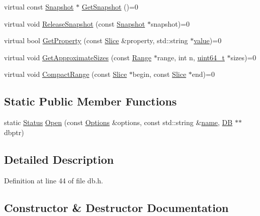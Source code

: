 \begin{DoxyCompactItemize}
\item 
virtual const \hyperlink{classleveldb_1_1_snapshot}{Snapshot} $\ast$ \hyperlink{classleveldb_1_1_d_b_a7d13f6336c7c5f0bf79578d57c45568c}{Get\+Snapshot} ()=0
\item 
virtual void \hyperlink{classleveldb_1_1_d_b_aa46de65e990bd179db0aee770af89144}{Release\+Snapshot} (const \hyperlink{classleveldb_1_1_snapshot}{Snapshot} $\ast$snapshot)=0
\item 
virtual bool \hyperlink{classleveldb_1_1_d_b_afcd557d80bac6668f20372c9e737d807}{Get\+Property} (const \hyperlink{classleveldb_1_1_slice}{Slice} \&property, std\+::string $\ast$\hyperlink{cache_8cc_a0f61d63b009d0880a89c843bd50d8d76}{value})=0
\item 
virtual void \hyperlink{classleveldb_1_1_d_b_ad4d54aa1dbcecc8583b013ab2d67aeff}{Get\+Approximate\+Sizes} (const \hyperlink{structleveldb_1_1_range}{Range} $\ast$range, int n, \hyperlink{stdint_8h_aaa5d1cd013383c889537491c3cfd9aad}{uint64\+\_\+t} $\ast$sizes)=0
\item 
virtual void \hyperlink{classleveldb_1_1_d_b_aeea500cbc6704454b3be6908d5da8b3a}{Compact\+Range} (const \hyperlink{classleveldb_1_1_slice}{Slice} $\ast$begin, const \hyperlink{classleveldb_1_1_slice}{Slice} $\ast$end)=0
\end{DoxyCompactItemize}
\subsection*{Static Public Member Functions}
\begin{DoxyCompactItemize}
\item 
static \hyperlink{classleveldb_1_1_status}{Status} \hyperlink{classleveldb_1_1_d_b_ac1da2b48e911287d86f3a3bfa0f851fe}{Open} (const \hyperlink{structleveldb_1_1_options}{Options} \&options, const std\+::string \&\hyperlink{testharness_8cc_a8f8f80d37794cde9472343e4487ba3eb}{name}, \hyperlink{classleveldb_1_1_d_b}{D\+B} $\ast$$\ast$dbptr)
\end{DoxyCompactItemize}


\subsection{Detailed Description}


Definition at line 44 of file db.\+h.



\subsection{Constructor \& Destructor Documentation}
\hypertarget{classleveldb_1_1_d_b_a6b275339ff6194c598daf7091ad8d5c1}{}
